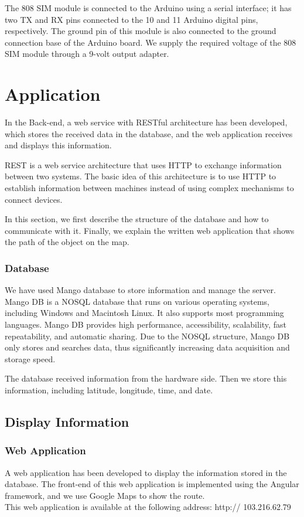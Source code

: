 The 808 SIM module is connected to the Arduino using a serial interface; it has two TX and RX pins connected to the 10 and 11 Arduino digital pins, respectively. The ground pin of this module is also connected to the ground connection base of the Arduino board. We supply the required voltage of the 808 SIM module through a 9-volt output adapter.
\section{Application}
In the Back-end, a web service with RESTful architecture has been developed, which stores the received data in the database, and the web application receives and displays this information.

REST is a web service architecture that uses HTTP to exchange information between two systems. The basic idea of this architecture is to use HTTP to establish information between machines instead of using complex mechanisms to connect devices.

In this section, we first describe the structure of the database and how to communicate with it. Finally, we explain the written web application that shows the path of the object on the map.
\subsubsection{Database}
We have used Mango database to store information and manage the server. Mango DB is a NOSQL database that runs on various operating systems, including Windows and Macintosh Linux. It also supports most programming languages. Mango DB provides high performance, accessibility, scalability, fast repeatability, and automatic sharing.
Due to the NOSQL structure, Mango DB only stores and searches data, thus significantly increasing data acquisition and storage speed.

The database received information from the hardware side. Then we store this information, including latitude, longitude, time, and date.

\subsection{Display Information}
\subsubsection{Web Application}
A web application has been developed to display the information stored in the database. The front-end of this web application is implemented using the Angular framework, and we use Google Maps to show the route.\\
This web application is available at the following address: http:// 103.216.62.79

